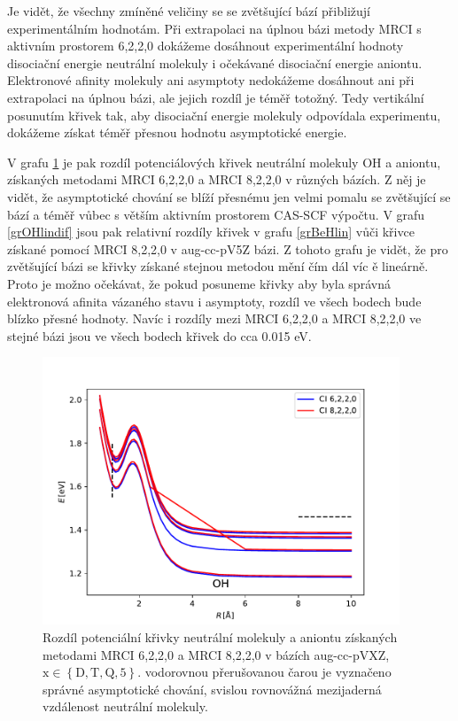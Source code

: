 Je vidět, že všechny zmíněné veličiny se se zvětšující bází přibližují experimentálním 
hodnotám. Při extrapolaci na úplnou bázi metody MRCI s aktivním prostorem 6,2,2,0 
dokážeme dosáhnout experimentální hodnoty disociační energie neutrální molekuly i 
očekávané disociační energie aniontu. Elektronové afinity molekuly ani asymptoty 
nedokážeme dosáhnout ani při extrapolaci na úplnou bázi, ale jejich rozdíl je téměř 
totožný. Tedy vertikální posunutím křivek tak, aby disociační energie molekuly 
odpovídala experimentu, dokážeme získat téměř přesnou hodnotu asymptotické energie. 
 
V grafu \ref{grOHlin} je pak rozdíl potenciálových křivek neutrální molekuly OH a 
aniontu, získaných metodami MRCI 6,2,2,0 a MRCI 8,2,2,0 v různých bázích. Z něj je 
vidět, že asymptotické chování se blíží přesnému jen velmi pomalu se 
zvětšující se bází a téměř vůbec s větším aktivním prostorem CAS-SCF výpočtu.
V grafu \ref{grOHlindif} jsou pak relativní rozdíly křivek v grafu \ref{grBeHlin} vůči 
křivce získané pomocí MRCI 8,2,2,0 v aug-cc-pV5Z bázi. Z tohoto grafu je vidět, že pro 
zvětšující bázi se křivky získané stejnou metodou mění čím dál víc ě lineárně. 
Proto je možno očekávat, že pokud posuneme křivky aby byla správná elektronová 
afinita vázaného stavu i asymptoty, rozdíl ve všech bodech bude blízko přesné 
hodnoty. Navíc i rozdíly mezi MRCI 6,2,2,0 a MRCI 8,2,2,0 ve stejné bázi
 jsou ve všech bodech křivek do cca 0.015 eV.

\begin{figure}
\centering
\includegraphics[width=0.95\textwidth]{../img/OH-lin.pdf}
\caption{Rozdíl potenciální křivky neutrální molekuly a aniontu získaných metodami MRCI 
6,2,2,0 a MRCI 8,2,2,0 v bázích aug-cc-pVXZ, $\mathrm{x \in \left\lbrace D,T,Q,5\right
\rbrace }$. vodorovnou přerušovanou čarou je vyznačeno správné asymptotické chování, 
svislou rovnovážná mezijaderná vzdálenost neutrální molekuly.}
\label{grOHlin}
\end{figure}

